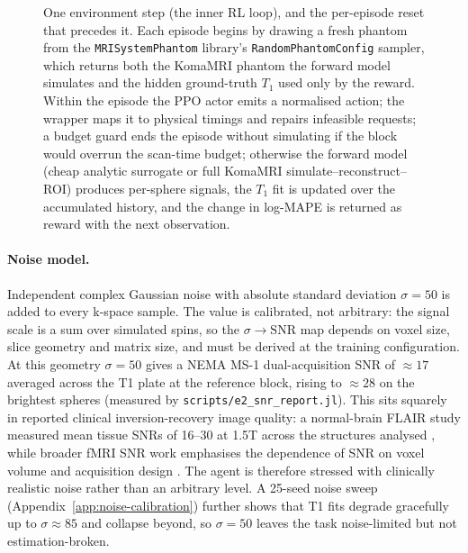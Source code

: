 \begin{figure}[!htbp]
{
}
\caption{One environment step (the inner RL loop), and the per-episode reset
that precedes it. Each episode begins by drawing a fresh phantom from the
\texttt{MRISystemPhantom} library's \texttt{RandomPhantomConfig} sampler,
which returns both the KomaMRI phantom the forward model simulates and the
hidden ground-truth $T_1$ used only by the reward. Within the episode the PPO
actor emits a normalised action; the wrapper maps it to physical timings and
repairs infeasible requests; a budget guard ends the episode without
simulating if the block would overrun the scan-time budget; otherwise the
forward model (cheap analytic surrogate or full KomaMRI
simulate--reconstruct--ROI) produces per-sphere signals, the $T_1$ fit is
updated over the accumulated history, and the change in log-MAPE is returned
as reward with the next observation.}
\label{fig:e2-env-loop}
\end{figure}
\fi

\paragraph{Noise model.} Independent complex Gaussian noise with absolute
standard deviation $\sigma=50$ is added to every k-space sample. The value is
calibrated, not arbitrary: the signal scale is a sum over simulated spins, so
the $\sigma\!\to\!\mathrm{SNR}$ map depends on voxel size, slice geometry and
matrix size, and must be derived at the training configuration. At this
geometry $\sigma=50$ gives a NEMA MS-1 dual-acquisition SNR of ${\approx}17$
averaged across the T1 plate at the reference block, rising to ${\approx}28$
on the brightest spheres (measured by \texttt{scripts/e2\_snr\_report.jl}).
This sits squarely in reported clinical inversion-recovery image quality: a
normal-brain FLAIR study measured mean tissue SNRs of 16--30 at 1.5T across
the structures analysed \cite{sohn2010flair}, while broader fMRI SNR work
 emphasises the dependence of SNR on voxel volume and acquisition design \cite{murphy2007howlongscan}.
The agent is therefore stressed with clinically realistic noise rather than an
arbitrary level. A 25-seed noise sweep
(Appendix~\ref{app:noise-calibration}) further shows that T1 fits degrade
gracefully up to $\sigma\approx85$ and collapse beyond, so $\sigma=50$ leaves
the task noise-limited but not estimation-broken.


